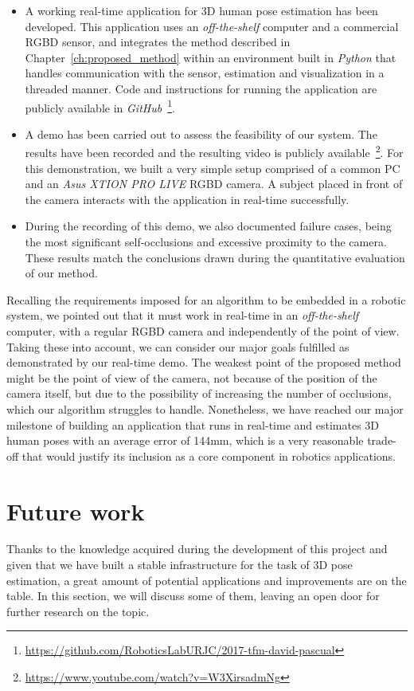 \begin{itemize}
    \item A working real-time application for 3D human pose estimation has been developed. This application uses an \emph{off-the-shelf} computer and a commercial RGBD sensor, and integrates the method described in Chapter~\ref{ch:proposed_method} within an environment built in \emph{Python} that handles communication with the sensor, estimation and visualization in a threaded manner. Code and instructions for running the application are publicly available in \emph{GitHub}~\footnote{\url{https://github.com/RoboticsLabURJC/2017-tfm-david-pascual}}.
    \item A demo has been carried out to assess the feasibility of our system. The results have been recorded and the resulting video is publicly available~\footnote{\url{https://www.youtube.com/watch?v=W3XirsadmNg}}. For this demonstration, we built a very simple setup comprised of a common PC and an \emph{Asus XTION PRO LIVE} RGBD camera. A subject placed in front of the camera interacts with the application in real-time successfully.
    \item During the recording of this demo, we also documented failure cases, being the most significant self-occlusions and excessive proximity to the camera. These results match the conclusions drawn during the quantitative evaluation of our method.
\end{itemize}

Recalling the requirements imposed for an algorithm to be embedded in a robotic system, we pointed out that it must work in real-time in an \emph{off-the-shelf} computer, with a regular RGBD camera and independently of the point of view. Taking these into account, we can consider our major goals fulfilled as demonstrated by our real-time demo. The weakest point of the proposed method might be the point of view of the camera, not because of the position of the camera itself, but due to the possibility of increasing the number of occlusions, which our algorithm struggles to handle. Nonetheless, we have reached our major milestone of building an application that runs in real-time and estimates 3D human poses with an average error of 144mm, which is a very reasonable trade-off that would justify its inclusion as a core component in robotics applications.

\section{Future work}
Thanks to the knowledge acquired during the development of this project and given that we have built a stable infrastructure for the task of 3D pose estimation, a great amount of potential applications and improvements are on the table. In this section, we will discuss some of them, leaving an open door for further research on the topic.

